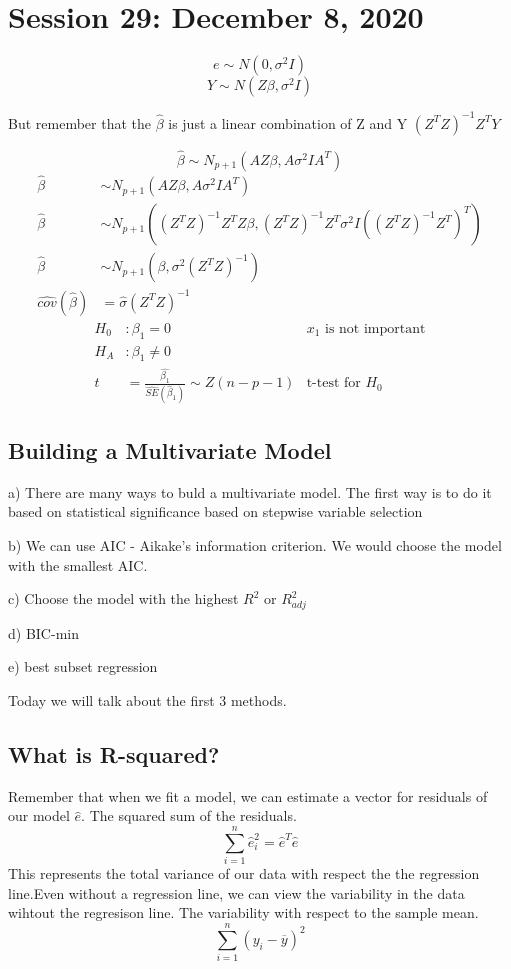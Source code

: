 \chapter{Session 29: December 8, 2020}

\[e \sim N(0,\sigma^2 I)\]
\[Y \sim N(Z\beta,\sigma^2 I)\]

But remember that the $\hat{\beta}$ is just a linear combination of Z and Y $(Z^TZ)^{-1}Z^TY$

\[\hat{\beta} \sim N_{p+1} (AZ\beta,A\sigma^2IA^T)\]
\begin{align*}
    \hat{\beta} & \sim N_{p+1} (AZ\beta,A\sigma^2IA^T) \\
    \hat{\beta} & \sim N_{p+1} ((Z^TZ)^{-1}Z^TZ\beta,(Z^TZ)^{-1}Z^T\sigma^2I((Z^TZ)^{-1}Z^T)^T)\\
    \hat{\beta} & \sim N_{p+1}(\beta,\sigma^2(Z^TZ)^{-1})\\
    \hat{cov}(\hat{\beta}) &= \hat{\sigma}(Z^TZ)^{-1}
\end{align*}
\begin{align*}
    H_0 &: \beta_1 = 0 &\text{$x_1$ is not important}\\
    H_A&: \beta_1 \neq 0 \\
    t &= \frac{\hat{\beta_1}}{\hat{SE}(\hat{\beta}_1)}\sim Z(n-p-1) &\text{t-test for $H_0$}
\end{align*}
\section{Building a Multivariate Model}
a) There are many ways to buld a multivariate model. The first way is to do it based on statistical significance based on stepwise variable selection

b) We can use AIC - Aikake's information criterion. We would choose the model with the smallest AIC.

c) Choose  the model with the highest $R^2$ or $R^2_{adj}$

d) BIC-min

e) best subset regression

Today we will talk about the first 3 methods.

\section{What is R-squared?}
Remember that when we fit a model, we can estimate a vector for residuals of our model $\hat{e}$. The squared sum of the residuals.
\[\displaystyle\sum_{i=1}^n\hat{e}_i^2=\hat{e}^T\hat{e}\]
This represents the total variance of our data with respect the the regression line.Even without a regression line, we can view the variability in the data wihtout the regresison line. The variability with respect to the sample mean.
\[\displaystyle\sum_{i=1}^n(y_i-\overline{y})^2\]

